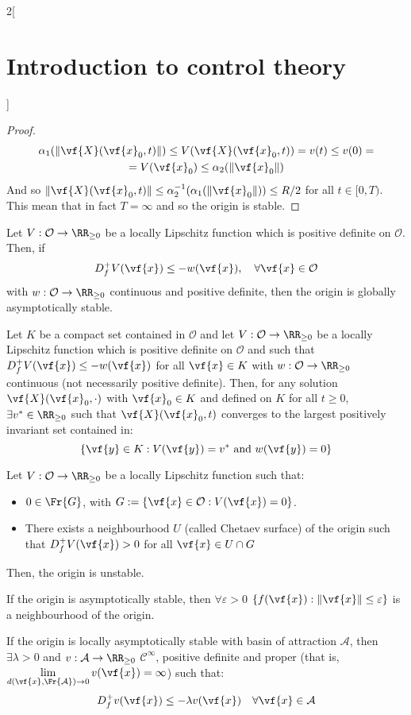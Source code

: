 \documentclass[../../../main_math.tex]{subfiles}
\begin{document}
\begin{multicols}{2}[\section{Introduction to control theory}]
\begin{proof}
    \begin{multline*}
      \alpha_1(\norm{\vf{X}(\vf{x}_0, t)})\leq V(\vf{X}(\vf{x}_0, t))=v(t) \leq v(0)=\\ = V(\vf{x}_0) \leq \alpha_2(\norm{\vf{x}_0})
    \end{multline*}
    And so $\norm{\vf{X}(\vf{x}_0, t)}\leq \alpha_2^{-1}(\alpha_1(\norm{\vf{x}_0}))\leq R/2$ for all $t\in[0, T)$. This mean that in fact $T=\infty$ and so the origin is stable.
  \end{proof}
  \begin{theorem}
    Let $V:\mathcal{O}\to \RR_{\geq 0}$ be a locally Lipschitz function which is positive definite on $\mathcal{O}$. Then, if
    $$
      D_f^+V(\vf{x})\leq -w(\vf{x}), \quad \forall \vf{x}\in \mathcal{O}
    $$
    with $w:\mathcal{O}\to \RR_{\geq 0}$ continuous and positive definite, then the origin is globally asymptotically stable.
  \end{theorem}
  \begin{theorem}
    Let $K$ be a compact set contained in $\mathcal{O}$ and let $V:\mathcal{O}\to \RR_{\geq 0}$ be a locally Lipschitz function which is positive definite on $\mathcal{O}$ and such that $D_f^+V(\vf{x})\leq -w(\vf{x})$ for all $\vf{x}\in K$ with $w:\mathcal{O}\to \RR_{\geq 0}$ continuous (not necessarily positive definite). Then, for any solution $\vf{X}(\vf{x}_0, \cdot)$ with $\vf{x}_0\in K$ and defined on $K$ for all $t\geq 0$, $\exists v^*\in\RR_{\geq 0}$ such that $\vf{X}(\vf{x}_0, t)$ converges to the largest positively invariant set contained in:
    $$
      \{\vf{y}\in K: V(\vf{y})=v^*\text{ and }w(\vf{y})=0\}
    $$
  \end{theorem}
  \begin{theorem}
    Let $V:\mathcal{O}\to \RR_{\geq 0}$ be a locally Lipschitz function such that:
    \begin{itemize}
      \item $0\in \Fr{G}$, with $G:=\{\vf{x}\in \mathcal{O}: V(\vf{x})=0\}$.
      \item There exists a neighbourhood $U$ (called Chetaev surface) of the origin such that $D_f^+V(\vf{x})>0$ for all $\vf{x}\in U\cap G$
    \end{itemize}
    Then, the origin is unstable.
  \end{theorem}
  \begin{theorem}
    If the origin is asymptotically stable, then $\forall\varepsilon>0$ $\{f(\vf{x}): \norm{\vf{x}}\leq \varepsilon\}$ is a neighbourhood of the origin.
  \end{theorem}
  \begin{theorem}
    If the origin is locally asymptotically stable with basin of attraction $\mathcal{A}$, then $\exists \lambda>0$ and $v:\mathcal{A}\to \RR_{\geq 0}$ $\mathcal{C}^\infty$, positive definite and proper (that is, $\displaystyle \lim_{d(\vf{x}, \Fr{\mathcal{A}})\to 0}v(\vf{x})=\infty$) such that:
    $$
      D_f^+v(\vf{x})\leq -\lambda v(\vf{x})\quad\forall \vf{x}\in \mathcal{A}
    $$
  \end{theorem}

\end{multicols}
\end{document}
